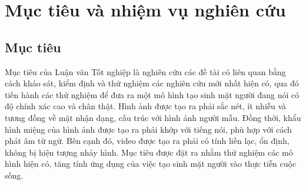 \section{\texorpdfstring{Mục tiêu và nhiệm vụ nghiên cứu}{target_and_mission}}

\subsection{\texorpdfstring{Mục tiêu}{Target}}
Mục tiêu của Luận văn Tốt nghiệp là nghiên cứu các đề tài có liên quan bằng cách khảo sát, kiểm định và thử nghiệm các nghiên cứu mới nhất hiện có, qua đó tiến hành các thử nghiệm để đưa ra một mô hình tạo sinh mặt người đang nói có độ chính xác cao và chân thật. Hình ảnh được tạo ra phải sắc nét, ít nhiễu và tương đồng về mặt nhận dạng, cấu trúc với hình ảnh người mẫu. Đồng thời, khẩu hình miệng của hình ảnh được tạo ra phải khớp với tiếng nói, phù hợp với cách phát âm từ ngữ. Bên cạnh đó, video được tạo ra phải có tính liền lạc, ổn định, không bị hiện tượng nhảy hình. Mục tiêu được đặt ra nhằm thử nghiệm các mô hình hiện có, tăng tính ứng dụng của việc tạo sinh mặt người vào thực tiễn cuộc sống.
